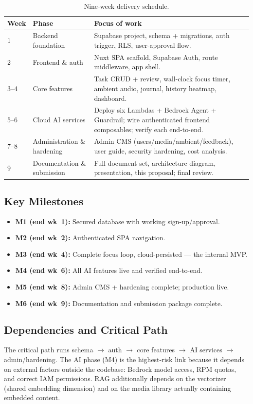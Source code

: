 \documentclass[a4paper,11pt]{article}
\begin{document}
	\begin{table}[H]
		\centering
		\footnotesize
		\begin{tabularx}{\textwidth}{@{}p{1.6cm} p{3.2cm} X@{}}
			\toprule
			\textbf{Week} & \textbf{Phase} & \textbf{Focus of work} \\
			\midrule
			1 & Backend foundation & Supabase project, schema + migrations, auth trigger, RLS, user-approval flow. \\
			2 & Frontend \& auth & Nuxt SPA scaffold, Supabase Auth, route middleware, app shell. \\
			3--4 & Core features & Task CRUD + review, wall-clock focus timer, ambient audio, journal, history heatmap, dashboard. \\
			5--6 & Cloud AI services & Deploy six Lambdas + Bedrock Agent + Guardrail; wire authenticated frontend composables; verify each end-to-end. \\
			7--8 & Administration \& hardening & Admin CMS (users/media/ambient/feedback), user guide, security hardening, cost analysis. \\
			9 & Documentation \& submission & Full document set, architecture diagram, presentation, this proposal; final review. \\
			\bottomrule
		\end{tabularx}
		\caption{Nine-week delivery schedule.}
		\label{tab:timeline}
	\end{table}

	\subsection{Key Milestones}
	\begin{itemize}
		\item \textbf{M1 (end wk~1):} Secured database with working sign-up/approval.
		\item \textbf{M2 (end wk~2):} Authenticated SPA navigation.
		\item \textbf{M3 (end wk~4):} Complete focus loop, cloud-persisted --- the internal MVP.
		\item \textbf{M4 (end wk~6):} All AI features live and verified end-to-end.
		\item \textbf{M5 (end wk~8):} Admin CMS + hardening complete; production live.
		\item \textbf{M6 (end wk~9):} Documentation and submission package complete.
	\end{itemize}

	\subsection{Dependencies and Critical Path}
	The critical path runs schema \(\rightarrow\) auth \(\rightarrow\) core features \(\rightarrow\)
	AI services \(\rightarrow\) admin/hardening. The AI phase (M4) is the highest-risk link
	because it depends on external factors outside the codebase: Bedrock model access, RPM
	quotas, and correct IAM permissions. RAG additionally depends on the vectorizer (shared
	embedding dimension) and on the media library actually containing embedded content.
\end{document}
